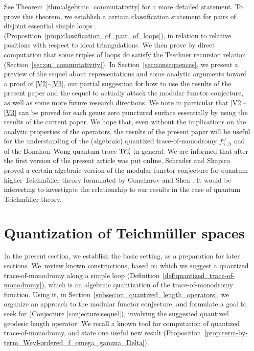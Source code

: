\documentclass[pdftex]{sigma}
\numberwithin{equation}{section}
\theoremstyle{definition}
\begin{document}
See Theorem~\ref{thm:algebraic_commutativity} for a more detailed statement. To prove this theorem, we establish a certain classification statement for pairs of disjoint essential simple loops (Proposition~\ref{prop:classification_of_pair_of_loops}), in relation to relative positions with respect to ideal triangulations. We then prove by direct computation that some triples of loops do satisfy the Teschner recursion relation (Section~\ref{sec:on_commutativity}).
In Section~\ref{sec:consequences}, we present a preview of the sequel \cite{sequel} about representations and some analytic arguments toward a proof of \ref{V2}--\ref{V3}, our partial suggestion for how to use the results of the present paper and the sequel \cite{sequel} to actually attack the modular functor conjecture, as well as some more future research directions. We note in particular that \ref{V2}--\ref{V3} can be proved for each genus zero punctured surface essentially by using the results of the current paper.
We hope that, even without the implications on the analytic properties of the operators, the results of the present paper will be useful for the understanding of the (algebraic) quantized trace-of-monodromy $f^\omega_{\gamma,\Delta}$ and of the Bonahon--Wong quantum trace ${\rm Tr}^\omega_\Delta$ in general.
We are informed that after the first version of the present article was put online, Schrader and Shapiro \cite{SS25} proved a certain algebraic version of the modular functor conjecture for quantum higher Teichm\"uller theory formulated by Goncharov and Shen \cite{GS19}. It would be interesting to investigate the relationship to our results in the case of quantum Teichm\"uller theory.
\section{Quantization of Teichm\"uller spaces}
In the present section, we establish the basic setting, as a preparation for later sections. We~review known constructions, based on which we suggest a quantized trace-of-monodromy along a simple loop (Definition~\ref{def:quantized_trace-of-monodromy}), which is an algebraic quantization of the trace-of-monodromy function. Using it, in Section~\ref{subsec:on_quantized_length_operators}, we organize an approach to the modular functor conjecture, and formulate a goal to seek for (Conjecture \ref{conjecture:sequel}), involving the suggested quantized geodesic length operator. We recall a known tool for computation of quantized trace-of-monodromy, and state one useful new result (Proposition~\ref{prop:term-by-term_Weyl-ordered_f_omega_gamma_Delta}).
\end{document}
